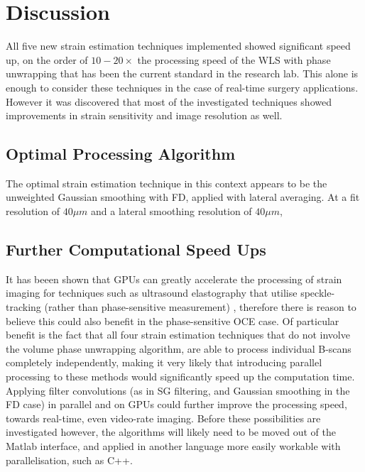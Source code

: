\chapter{Discussion}


All five new strain estimation techniques implemented showed significant speed up, on the order of $10-20\times$ the processing speed of the WLS with phase unwrapping that has been the current standard in the research lab. This alone is enough to consider these techniques in the case of real-time surgery applications. However it was discovered that most of the investigated techniques showed improvements in strain sensitivity and image resolution as well.

\section{Optimal Processing Algorithm}

The optimal strain estimation technique in this context appears to be the unweighted Gaussian smoothing with FD, applied with lateral averaging. At a fit resolution of $40\mu m$ and a lateral smoothing resolution of $40\mu m$, 

\section{Further Computational Speed Ups}

It has beeen shown that GPUs can greatly accelerate the processing of strain imaging for techniques such as ultrasound elastography that utilise speckle-tracking (rather than phase-sensitive measurement) \cite{peng_gpu-accelerated_2017}, therefore there is reason to believe this could also benefit in the phase-sensitive OCE case. Of particular benefit is the fact that all four strain estimation techniques that do not involve the volume phase unwrapping algorithm, are able to process individual B-scans completely independently, making it very likely that introducing parallel processing to these methods would significantly speed up the computation time. Applying filter convolutions (as in SG filtering, and Gaussian smoothing in the FD case) in parallel and on GPUs could further improve the processing speed, towards real-time, even video-rate imaging.
Before these possibilities are investigated however, the algorithms will likely need to be moved out of the Matlab interface, and applied in another language more easily workable with parallelisation, such as C++.

